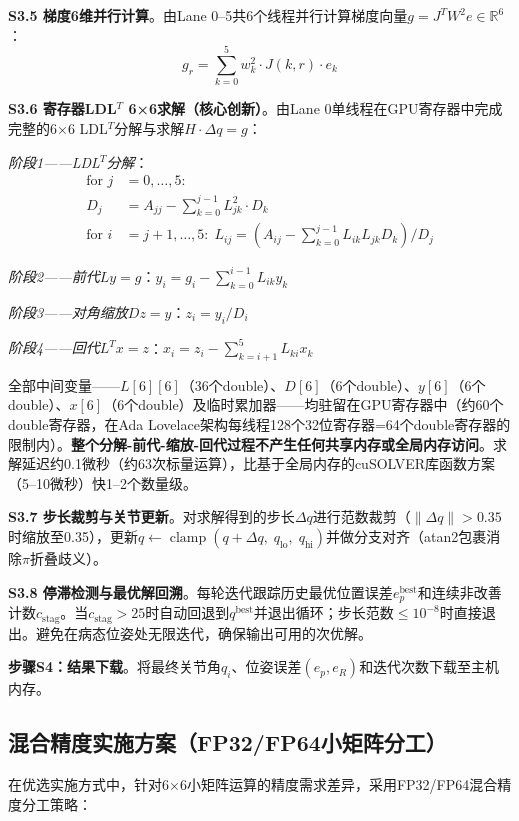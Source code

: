 \documentclass[a4paper,12pt]{ctexart}
\newcommand{\R}{\mathbb{R}}
\begin{document}
\textbf{S3.5 梯度6维并行计算}。由Lane 0--5共6个线程并行计算梯度向量$g=J^T W^2 e\in\R^6$：
\begin{equation}
g_r=\sum_{k=0}^{5}w_k^2\cdot J(k,r)\cdot e_k
\end{equation}

\textbf{S3.6 寄存器LDL$^T$ 6×6求解（核心创新）}。由Lane 0单线程在GPU寄存器中完成完整的6×6 LDL$^T$分解与求解$H\cdot\Delta q=g$：

\textit{阶段1——LDL$^T$分解}：
\begin{align}
\text{for }j&=0,\dots,5: \nonumber\\
D_j&=A_{jj}-\sum_{k=0}^{j-1}L_{jk}^2\cdot D_k \\
\text{for }i&=j+1,\dots,5: \; L_{ij}=(A_{ij}-\sum_{k=0}^{j-1}L_{ik}L_{jk}D_k)/D_j \nonumber
\end{align}

\textit{阶段2——前代$Ly=g$}：$y_i=g_i-\sum_{k=0}^{i-1}L_{ik}y_k$

\textit{阶段3——对角缩放$Dz=y$}：$z_i=y_i/D_i$

\textit{阶段4——回代$L^T x=z$}：$x_i=z_i-\sum_{k=i+1}^{5}L_{ki}x_k$

全部中间变量——$L[6][6]$（36个double）、$D[6]$（6个double）、$y[6]$（6个double）、$x[6]$（6个double）及临时累加器——均驻留在GPU寄存器中（约60个double寄存器，在Ada Lovelace架构每线程128个32位寄存器=64个double寄存器的限制内）。\textbf{整个分解-前代-缩放-回代过程不产生任何共享内存或全局内存访问}。求解延迟约0.1微秒（约63次标量运算），比基于全局内存的cuSOLVER库函数方案（5--10微秒）快1--2个数量级。

\textbf{S3.7 步长裁剪与关节更新}。对求解得到的步长$\Delta q$进行范数裁剪（$\|\Delta q\|>0.35$时缩放至0.35），更新$q\leftarrow\operatorname{clamp}(q+\Delta q,\;q_{\text{lo}},\;q_{\text{hi}})$并做分支对齐（atan2包裹消除$\pi$折叠歧义）。

\textbf{S3.8 停滞检测与最优解回溯}。每轮迭代跟踪历史最优位置误差$e_p^{\text{best}}$和连续非改善计数$c_{\text{stag}}$。当$c_{\text{stag}}>25$时自动回退到$q^{\text{best}}$并退出循环；步长范数$\leq10^{-8}$时直接退出。避免在病态位姿处无限迭代，确保输出可用的次优解。

\textbf{步骤S4：结果下载}。将最终关节角$q_i$、位姿误差$(e_p,e_R)$和迭代次数下载至主机内存。

\subsection{混合精度实施方案（FP32/FP64小矩阵分工）}

在优选实施方式中，针对6×6小矩阵运算的精度需求差异，采用FP32/FP64混合精度分工策略：
\end{document}
